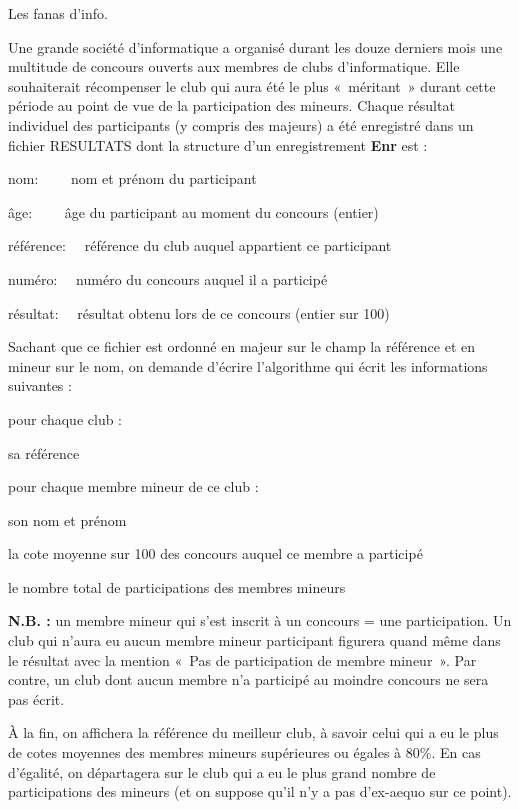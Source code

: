\begin{Exercice}{Les fanas d'info.}

	Une grande société d’informatique a organisé durant les douze derniers
	mois une multitude de concours ouverts aux membres de clubs
	d’informatique. Elle souhaiterait récompenser le club qui aura été le
	plus «~méritant~» durant cette période au point de vue de la
	participation des mineurs. Chaque résultat individuel des participants
	(y compris des majeurs) a été enregistré dans un fichier RESULTATS dont
	la structure d’un enregistrement \textbf{Enr} est :

	{	nom: \ \ \ \ nom et prénom du participant}

	{	âge: \ \ \ \ âge du participant au moment du concours (entier)}

	{	référence: \ \ référence du club auquel appartient ce participant}

	{	numéro: \ \ numéro du concours auquel il a participé}

	{	résultat: \ \ résultat obtenu lors de ce concours (entier sur 100)}

	Sachant que ce fichier est ordonné en majeur sur le champ la référence
	et en mineur sur le nom, on demande d’écrire l’algorithme qui écrit les
	informations suivantes :

	pour chaque club :

	\liststyleListv
	\begin{liste}
		\item 
			sa référence
		\item 
			pour chaque membre mineur de ce club :
		\item 
			son nom et prénom
		\item 
				la cote moyenne sur 100 des concours auquel ce membre a participé
		\item 
			le nombre total de participations des membres mineurs
	\end{liste}
	
	\textbf{N.B. : }un membre mineur qui s’est inscrit à un concours = une
	participation. Un club qui n’aura eu aucun membre mineur participant
	figurera quand même dans le résultat avec la mention «~Pas de
	participation de membre mineur~». Par contre, un club dont aucun membre
	n’a participé au moindre concours ne sera pas écrit.

	À la fin, on affichera la référence du meilleur club, à savoir celui qui
	a eu le plus de cotes moyennes des membres mineurs supérieures ou
	égales à 80\%. En cas d’égalité, on départagera sur le club qui a eu le
	plus grand nombre de participations des mineurs (et on suppose qu’il
	n’y a pas d’ex-aequo sur ce point). 
\end{Exercice}

